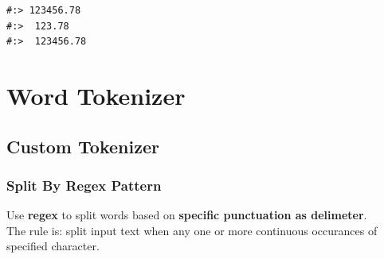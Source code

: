 \documentclass[
]{book}
\newenvironment{Shaded}{\begin{snugshade}}{\end{snugshade}}
\newcommand{\BuiltInTok}[1]{#1}
\newcommand{\CharTok}[1]{\textcolor[rgb]{0.5,0.5,0.5}{#1}}
\newcommand{\ControlFlowTok}[1]{\textcolor[rgb]{0.27,0.27,0.27}{\textbf{#1}}}
\newcommand{\DecValTok}[1]{\textcolor[rgb]{0.06,0.06,0.06}{#1}}
\newcommand{\KeywordTok}[1]{\textcolor[rgb]{0.27,0.27,0.27}{\textbf{#1}}}
\newcommand{\NormalTok}[1]{#1}
\newcommand{\OperatorTok}[1]{\textcolor[rgb]{0.43,0.43,0.43}{\textbf{#1}}}
\newcommand{\StringTok}[1]{\textcolor[rgb]{0.5,0.5,0.5}{#1}}
\newcommand{\VerbatimStringTok}[1]{\textcolor[rgb]{0.5,0.5,0.5}{#1}}
\begin{document}
\begin{Shaded}
\end{Shaded}

\begin{verbatim}
#:> 123456.78 
#:>  123.78 
#:>  123456.78
\end{verbatim}

\hypertarget{word-tokenizer}{%
\section{Word Tokenizer}\label{word-tokenizer}}

\hypertarget{custom-tokenizer}{%
\subsection{Custom Tokenizer}\label{custom-tokenizer}}

\hypertarget{split-by-regex-pattern}{%
\subsubsection{Split By Regex Pattern}\label{split-by-regex-pattern}}

Use \textbf{regex} to split words based on \textbf{specific punctuation as delimeter}.\\
The rule is: split input text when any one or more continuous occurances of specified character.
\end{document}

